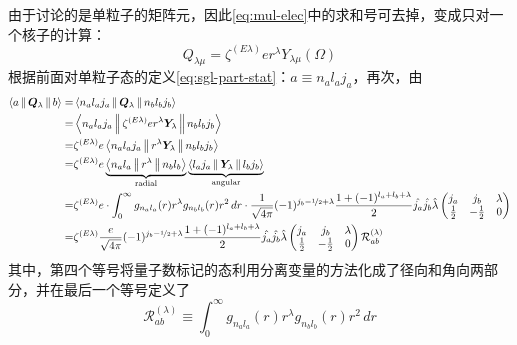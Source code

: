 \begin{exercise}
    由于讨论的是单粒子的矩阵元，因此\cref{eq:mul-elec}中的求和号可去掉，变成只对一个核子的计算：
    $$Q_{\lambda\mu} = \zeta^{(E\lambda)} e r^{\lambda} Y_{\lambda\mu}(\Omega)$$
    根据前面对单粒子态的定义\cref{eq:sgl-part-stat}：$a \equiv n_{a} l_{a} j_{a}$，再次，由\citet[see][Eq. 2.57]{suhonen-NtoN}
    \begin{equation*}\begin{aligned}
        \Braket{a || \bm{Q}_{\lambda} || b } =& \Braket{n_a l_a j_a || \bm{Q}_{\lambda} || n_b l_b j_b} \\
        =& \Braket{n_a l_a j_a || \zeta^{(E\lambda)} e r^{\lambda} \bm{Y}_{\lambda} || n_b l_b j_b} \\
        =& \zeta^{(E\lambda)} e \Braket{n_a l_a j_a || r^{\lambda} \bm{Y}_{\lambda} || n_b l_b j_b} \\
        =& \zeta^{(E\lambda)} e \underbrace{\Braket{n_a l_a || r^{\lambda} || n_b l_b}}_{\rm radial} \underbrace{\Braket{ l_a j_a || \bm{Y}_{\lambda} || l_b j_b}}_{\rm angular} \\
        =& \zeta^{(E\lambda)} e \cdot
           \int_0^{\infty} g_{n_a l_a}(r) r^{\lambda} g_{n_b l_b}(r) r^2\, dr \cdot
           \frac{1}{\sqrt{4\pi}} (-1)^{j_b - \nicefrac{1}{2} + \lambda} \frac{1 + (-1)^{l_a + l_b + \lambda}}{2} \hat{j_a}\hat{j_b}\hat{\lambda}\begin{pmatrix}
            j_a         &           j_b  & \lambda \\
            \frac{1}{2} &   -\frac{1}{2} &   0
           \end{pmatrix} \\
        =& \zeta^{(E\lambda)} \frac{e}{\sqrt{4\pi}}
            (-1)^{j_b - \nicefrac{1}{2} + \lambda} \frac{1 + (-1)^{l_a + l_b + \lambda}}{2} \hat{j_a}\hat{j_b}\hat{\lambda}\begin{pmatrix}
            j_a         &           j_b  & \lambda \\
            \frac{1}{2} &   -\frac{1}{2} &   0
           \end{pmatrix}
           \mathcal{R}_{ab}^{(\lambda)}  
    \end{aligned}\end{equation*}
    其中，第四个等号将量子数标记的态利用分离变量的方法化成了径向和角向两部分，并在最后一个等号定义了
    $$\mathcal{R}_{ab}^{(\lambda)} \equiv \int_0^{\infty} g_{n_a l_a}(r) r^{\lambda} g_{n_b l_b}(r) r^2\, dr$$
\end{exercise}



